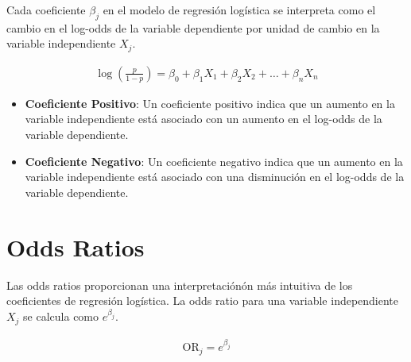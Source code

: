 \documentclass[a4paper]{report} %
\begin{document}

Cada coeficiente $\beta_j$ en el modelo de regresi\'on log\'istica se interpreta como el cambio en el log-odds de la variable dependiente por unidad de cambio en la variable independiente $X_j$.

\begin{eqnarray*}
\log\left(\frac{p}{1-p}\right) = \beta_0 + \beta_1 X_1 + \beta_2 X_2 + \ldots + \beta_n X_n
\end{eqnarray*}


\begin{itemize}
    \item \textbf{Coeficiente Positivo}: Un coeficiente positivo indica que un aumento en la variable independiente est\'a asociado con un aumento en el log-odds de la variable dependiente.
    \item \textbf{Coeficiente Negativo}: Un coeficiente negativo indica que un aumento en la variable independiente est\'a asociado con una disminuci\'on en el log-odds de la variable dependiente.
\end{itemize}

\section{Odds Ratios}

Las odds ratios proporcionan una interpretación\'on m\'as intuitiva de los coeficientes de regresi\'on log\'istica. La odds ratio para una variable independiente $X_j$ se calcula como $e^{\beta_j}$.


\begin{eqnarray*}
\text{OR}_j = e^{\beta_j}
\end{eqnarray*}

\end{document}
